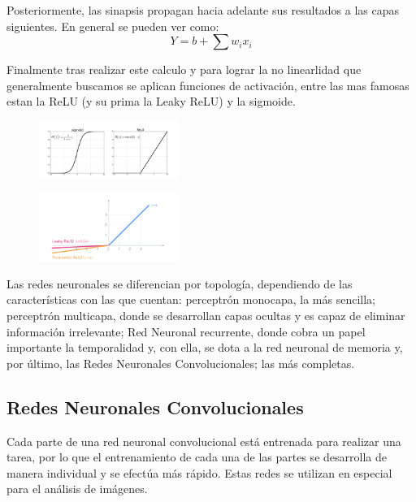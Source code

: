 \documentclass[10pt, fleqn, journal]{IEEEtran}
\theoremstyle{break}                                            %
\begin{document}
      Posteriormente, las sinapsis propagan hacia adelante sus resultados a las capas siguientes.
      En general se pueden ver como:
      \begin{equation}
          Y = b + \sum{w_i x_i}
      \end{equation}

      Finalmente tras realizar este calculo y para lograr la no linearlidad que generalmente buscamos
      se aplican funciones de activación, entre las mas famosas estan la ReLU (y su prima la Leaky ReLU) y la sigmoide.

      \begin{figure}[ht!]
        \includegraphics[width=0.4\textwidth]{activation}
      \end{figure}

      \cite{photos}

      \begin{figure}[ht!]
        \includegraphics[width=0.4\textwidth]{leaky}
      \end{figure}

      \cite{photos}

      Las redes neuronales se diferencian por topología, dependiendo de las características con las 
      que cuentan: perceptrón monocapa, la más sencilla; perceptrón multicapa, donde se desarrollan 
      capas ocultas y es capaz de eliminar información irrelevante; Red Neuronal recurrente, donde 
      cobra un papel importante la temporalidad y, con ella, se dota a la red neuronal de memoria 
      y, por último, las Redes Neuronales Convolucionales; las más completas.
  
    \subsection{Redes Neuronales Convolucionales}
      Cada parte de una red neuronal convolucional está entrenada para realizar una tarea, 
      por lo que el entrenamiento de cada una de las partes se desarrolla de manera individual y 
      se efectúa más rápido. Estas redes se utilizan en especial para el análisis de imágenes.
\end{document}
